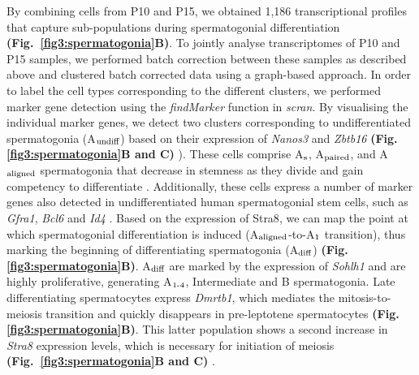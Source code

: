 By combining cells from P10 and P15, we obtained 1,186 transcriptional profiles that capture sub-populations during spermatogonial differentiation \textbf{(Fig.~\ref{fig3:spermatogonia}B)}. 
To jointly analyse transcriptomes of P10 and P15 samples, we performed batch correction between these samples as described above and clustered batch corrected data using a graph-based approach. 
In order to label the cell types corresponding to the different clusters, we performed marker gene detection using the \emph{findMarker} function in \emph{scran}. By visualising the individual marker genes, we detect two clusters corresponding to undifferentiated spermatogonia (A$_\textnormal{undiff}$) based on their expression of \textit{Nanos3} and \textit{Zbtb16} \textbf{(Fig. \ref{fig3:spermatogonia}B and C)} \citep{Buaas2004, Lolicato2008}). These cells comprise A$_\textnormal{s}$, A$_\textnormal{paired}$, and A$_\textnormal{aligned}$ spermatogonia that decrease in stemness as they divide and gain competency to differentiate \citep{Suzuki2012}. 
Additionally, these cells express a number of marker genes also detected in undifferentiated human spermatogonial stem cells, such as \textit{Gfra1}, \textit{Bcl6} and \textit{Id4} \citep{Guo2017}. 
Based on the expression of \gls{Stra8}, we can map the point at which spermatogonial differentiation is induced (A$_\textnormal{aligned}$-to-A$_\textnormal{1}$ transition), thus marking the beginning of differentiating spermatogonia (A$_\textnormal{diff}$) \citep{Endo2015} \textbf{(Fig. \ref{fig3:spermatogonia}B)}. A$_\textnormal{diff}$ are marked by the expression of \textit{Sohlh1} \citep{Ballow2006} and are highly proliferative, generating A$_\textnormal{1-4}$, Intermediate and B spermatogonia. 
Late differentiating spermatocytes express \textit{Dmrtb1}, which mediates the mitosis-to-meiosis transition and quickly disappears in pre-leptotene spermatocytes \textbf{(Fig. \ref{fig3:spermatogonia}B)}. 
This latter population shows a second increase in \textit{Stra8} expression levels, which is necessary for initiation of meiosis \textbf{(Fig.~\ref{fig3:spermatogonia}B and C)} \citep{Anderson2008, Endo2015, Zhang2014}. 

\newpage

